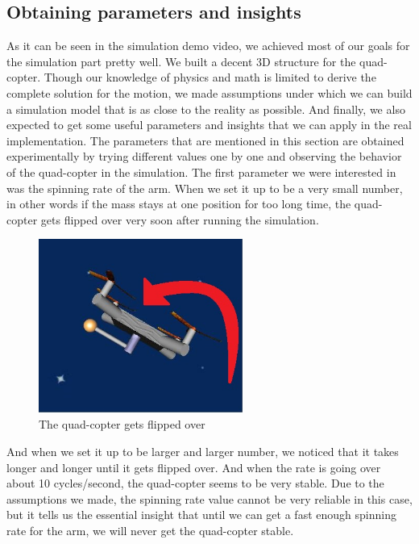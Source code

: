 \subsection{Obtaining parameters and insights}
As it can be seen in the simulation demo video, we achieved most of our goals for the simulation part pretty well. We built a decent 3D structure for the quad-copter. Though our knowledge of physics and math is limited to derive the complete solution for the motion, we made assumptions under which we can build a simulation model that is as close to the reality as possible. 
\newline
\newline
And finally, we also expected to get some useful parameters and insights that we can apply in the real implementation. The parameters that are mentioned in this section are obtained experimentally by trying different values one by one and observing the behavior of the quad-copter in the simulation.
\newline
\newline
The first parameter we were interested in was the spinning rate of the arm. When we set it up to be a very small number, in other words if the mass stays at one position for too long time, the quad-copter gets flipped over very soon after running the simulation. 
\begin{figure}[h]
\centering
\includegraphics[width=0.6\textwidth]{./Lin_img/8.JPG}
\caption{The quad-copter gets flipped over}
\end{figure}
\newline
And when we set it up to be larger and larger number, we noticed that it takes longer and longer until it gets flipped over. And when the rate is going over about 10 cycles/second, the quad-copter seems to be very stable.
\newline
\newline
Due to the assumptions we made, the spinning rate value cannot be very reliable in this case, but it tells us the essential insight that until we can get a fast enough spinning rate for the arm, we will never get the quad-copter stable.
